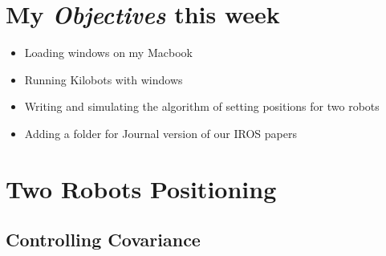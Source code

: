 \newcommand{\handoutName}{Weekly report}
\newcommand{\handoutdate}{\today}


\section{My \emph{Objectives} this week}
\begin{itemize}
\item Loading windows on my Macbook
\item Running Kilobots with windows
\item Writing and simulating the algorithm of setting positions for two robots
\item Adding a folder for Journal version of our IROS papers
\end{itemize}


\section{Two Robots Positioning}\label{sec:algorithm}


\subsection{Controlling Covariance}

